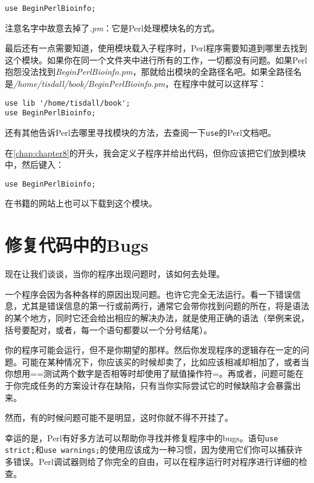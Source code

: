 \begin{lstlisting}
use BeginPerlBioinfo;
\end{lstlisting}

注意名字中故意去掉了\textit{.pm}：它是Perl处理模块名的方式。

最后还有一点需要知道，使用模块载入子程序时，Perl程序需要知道到哪里去找到这个模块。如果你在同一个文件夹中进行所有的工作，一切都没有问题。如果Perl抱怨没法找到\textit{BeginPerlBioinfo.pm}，那就给出模块的全路径名吧。如果全路径名是\textit{/home/tisdall/book/BeginPerlBioinfo.pm}，在程序中就可以这样写：

\begin{lstlisting}
use lib '/home/tisdall/book';
use BeginPerlBioinfo;
\end{lstlisting}

还有其他告诉Perl去哪里寻找模块的方法，去查阅一下\verb|use|的Perl文档吧。

在\autoref{chap:chapter8}的开头，我会定义子程序并给出代码，但你应该把它们放到模块中，然后键入：

\begin{lstlisting}
use BeginPerlBioinfo;
\end{lstlisting}

在书籍的网站上也可以下载到这个模块。

\section{修复代码中的Bugs}
现在让我们谈谈，当你的程序出现问题时，该如何去处理。

一个程序会因为各种各样的原因出现问题。也许它完全无法运行。看一下错误信息，尤其是错误信息的第一行或前两行，通常它会带你找到问题的所在，将是语法的某个地方，同时它还会给出相应的解决办法，就是使用正确的语法（举例来说，括号要配对，或者，每一个语句都要以一个分号结尾）。

你的程序可能会运行，但不是你期望的那样。然后你发现程序的逻辑存在一定的问题。可能在某种情况下，你应该买的时候却卖了，比如应该相减却相加了，或者当你想用==测试两个数字是否相等时却使用了赋值操作符=。再或者，问题可能在于你完成任务的方案设计存在缺陷，只有当你实际尝试它的时候缺陷才会暴露出来。

然而，有的时候问题可能不是明显，这时你就不得不开挂了。

幸运的是，Perl有好多方法可以帮助你寻找并修复程序中的bugs。语句\verb|use strict;|和\verb|use warnings;|的使用应该成为一种习惯，因为使用它们你可以捕获许多错误。Perl调试器则给了你完全的自由，可以在程序运行时对程序进行详细的检查。

